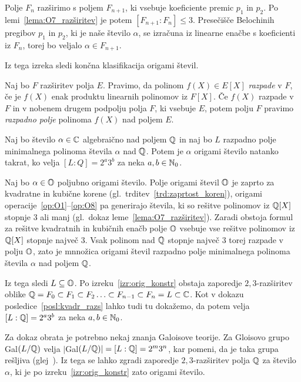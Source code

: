\begin{dokaz}
    Polje $F_n$ razširimo s poljem $F_{n+1}$, ki vsebuje koeficiente premic $p_1$ in $p_2$. Po lemi~\ref{lema:O7_razširitev} je potem $[F_{n+1}:F_n] \leq 3$. Presečišče Belochinih pregibov $p_1$ in $p_2$, ki je naše število $\alpha$, se izračuna iz linearne enačbe s koeficienti iz $F_n$, torej bo veljalo $\alpha \in F_{n+1}$.
\end{dokaz}

Iz tega izreka sledi končna klasifikacija origami števil.

\begin{definicija}
    Naj bo $F$ razširitev polja $E$. Pravimo, da polinom $f(X) \in E[X]$ \emph{razpade} v $F$, če je $f(X)$ enak produktu linearnih polinomov iz $F[X]$. Če $f(X)$ razpade v $F$ in v nobenem drugem podpolju polja $F$, ki vsebuje $E$, potem polju $F$ pravimo \emph{razpadno polje} polinoma $f(X)$ nad poljem $E$.
\end{definicija}

\begin{izrek}
    \label{izr:orig_razp_polje}
    Naj bo število $\alpha \in \mathbb C$ algebraično nad poljem $\mathbb Q$ in naj bo $L$ razpadno polje minimalnega polinoma števila $\alpha$ nad $\mathbb Q$. Potem je $\alpha$ origami število natanko takrat, ko velja $[L:Q]=2^a3^b$ za neka $a, b \in \mathbb N_0$.
\end{izrek}
\begin{dokaz}
    Naj bo $\alpha \in \mathbb O$ poljubno origami število. Polje origami števil $\mathbb O$ je zaprto za kvadratne in kubične korene (gl.\ trditev~\ref{trd:zaprtost_koren}), origami operacije~\ref{op:O1}--\ref{op:O8} pa generirajo števila, ki so rešitve polinomov iz $\mathbb Q[X]$ stopnje $3$ ali manj (gl.\ dokaz leme~\ref{lema:O7_razširitev}). Zaradi obstoja formul za rešitve kvadratnih in kubičnih enačb polje $\mathbb O$ vsebuje vse rešitve polinomov iz $\mathbb Q[X]$ stopnje največ 3. Vsak polinom nad $\mathbb Q$ stopnje največ $3$ torej razpade v polju $\mathbb O$, zato je mnnožica origami števil razpadno polje minimalnega polinoma števila $\alpha$ nad poljem $\mathbb Q$.
    
    Iz tega sledi $L \subseteq \mathbb O$. Po izreku~\ref{izr:orig_konstr} obstaja zaporedje $2,3$-razširitev oblike $ \mathbb Q = F_0 \subset F_1 \subset F_2 \ldots \subset F_{n-1} \subset F_n = L \subset \mathbb C $. Kot v dokazu posledice~\ref{posl:kvadr_razs} lahko tudi tu dokažemo, da potem velja $[L:\mathbb Q]=2^a3^b$ za neka $a, b \in \mathbb N_0$.

    Za dokaz obrata je potrebno nekaj znanja Galoisove teorije. Za Gloisovo grupo Gal$(L/ \mathbb Q)$ velja $|$Gal$(L/ \mathbb Q)| = [L:\mathbb Q] = 2^m3^n$, kar pomeni, da je taka grupa rešljiva (glej~\cite{burnside1904}). Iz tega se lahko zgradi zaporedje $2,3$-razširitev polja $\mathbb Q$ za število $\alpha$, ki je po izreku~\ref{izr:orig_konstr} zato origami število.
\end{dokaz}

